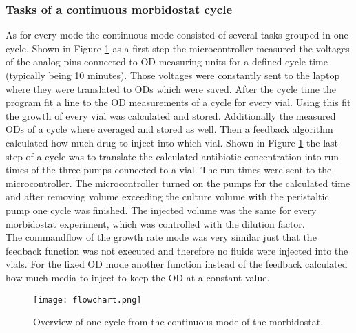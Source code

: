 \subsubsection{Tasks of a continuous morbidostat cycle}
As for every mode the continuous mode consisted of several tasks grouped in one cycle. Shown in Figure \ref{figure:flowchart} as a first step the microcontroller measured the voltages of the analog pins connected to OD measuring units for a defined cycle time (typically being 10 minutes). Those voltages were constantly sent to the laptop where they were translated to ODs which were saved. After the cycle time the program fit a line to the OD measurements of a cycle for every vial. Using this fit the growth of every vial was calculated and stored. Additionally the measured ODs of a cycle where averaged and stored as well. Then a feedback algorithm calculated how much drug to inject into which vial. Shown in Figure \ref{figure:flowchart} the last step of a cycle was to translate the calculated antibiotic concentration into run times of the three pumps connected to a vial. The run times were sent to the microcontroller. The microcontroller turned on the pumps for the calculated time and after removing volume exceeding the culture volume with the peristaltic pump one cycle was finished. The injected volume was the same for every morbidostat experiment, which was controlled with the dilution factor.  \\
The commandflow of the growth rate mode was very similar just that the feedback function was not executed and therefore no fluids were injected into the vials. For the fixed OD mode another function instead of the feedback  calculated how much media to inject to keep the OD at a constant value. 

\begin{figure}
	\texttt{[image: flowchart.png]}
	\caption{Overview of one cycle from the continuous mode of the morbidostat.}
	\label{figure:flowchart}	
\end{figure}

